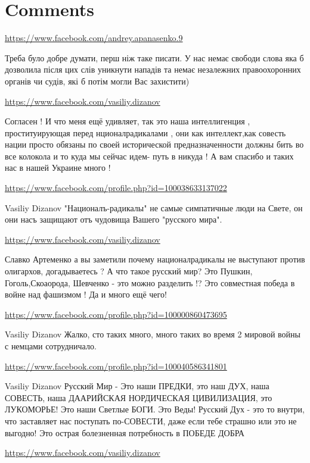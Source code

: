 \documentclass[a4paper,11pt]{extreport}
\begin{document}
\section{Comments}
\begin{itemize}
\url{https://www.facebook.com/andrey.apanasenko.9}

Треба було добре думати, перш ніж таке писати. У нас немає свободи слова яка б дозволила після цих слів уникнути нападів та немає незалежних правоохоронних органів чи судів, які б потім могли Вас захистити)

\url{https://www.facebook.com/vasiliy.dizanov}

Согласен ! И что меня ещё удивляет, так это наша интеллигенция , проституирующая перед нционалрадикалами , они как интеллект,как совесть нации просто обязаны по своей исторической предназначенности должны бить во все колокола и то куда мы сейчас идем- путь в никуда ! А вам спасибо и таких нас в нашей Украине много !

\begin{itemize}
\url{https://www.facebook.com/profile.php?id=100038633137022}

Vasiliy Dizanov "Националъ-радикалы" не самые симпатичные люди на Свете, он они насъ защищают отъ чудовища Вашего "русского мира".

\url{https://www.facebook.com/vasiliy.dizanov}

Славко Артеменко а вы заметили почему националрадикалы не выступают против олигархов, догадываетесь ? А что такое русский мир? Это Пушкин, Гоголь,Скоаорода, Шевченко - это можно разделить !? Это совместная победа в войне над фашизмом ! Да и много ещё чего!

\url{https://www.facebook.com/profile.php?id=100000860473695}

Vasiliy Dizanov Жалко, сто таких много, много таких во время 2 мировой войны с немцами сотрудничало.

\url{https://www.facebook.com/profile.php?id=100040586341801}

Vasiliy Dizanov Русский Мир - Это наши ПРЕДКИ, это наш ДУХ, наша СОВЕСТЬ, наша ДААРИЙСКАЯ НОРДИЧЕСКАЯ ЦИВИЛИЗАЦИЯ, это ЛУКОМОРЬЕ! Это наши Светлые БОГИ. Это Веды! Русский Дух - это то внутри, что заставляет нас поступать по-СОВЕСТИ, даже если тебе страшно или это не выгодно! Это острая болезненная потребность в ПОБЕДЕ ДОБРА

\url{https://www.facebook.com/vasiliy.dizanov}


\end{itemize}
\end{itemize}
\end{document}
